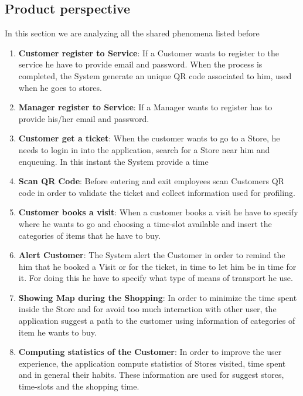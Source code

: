 \documentclass[a4paper, 10pt, oneside]{article}
\newcommand{\yasmin}[1]{\textcolor{Red}{#1}}
\newcommand{\giovanni}[1]{\textcolor{Blue}{#1}}
\begin{document}
\subsection{Product perspective}
In this section we are analyzing all the shared phenomena listed before
\begin{enumerate}
\item \textbf{Customer register to Service}: If a Customer wants to register to the service he have to provide email and password.
When the process is completed, the System generate an unique QR code associated to him, used when he goes to stores.

\item \textbf{Manager register to Service}: If a Manager wants to register has to provide his/her email and password. 

\item \textbf{Customer get a ticket}: When the customer wants to go to a Store, he needs to login in into the application, search for a Store near him and enqueuing. In this instant the System provide a time 

\item \textbf{Scan QR Code}: Before entering and exit employees scan Customers QR code in order to validate the ticket and collect information used for profiling.

\item \textbf{Customer books a visit}: When a customer books a visit he have to specify where he wants to go and choosing a time-slot available and insert the categories of items that he have to buy. 

\item \textbf{Alert Customer}: The System alert the Customer in order to remind the him that he booked a Visit or for the ticket, in time to let him be in time for it.
For doing this he have to specify what type of means of transport he use.

\item \textbf{Showing Map during the Shopping}: In order to minimize the time spent inside the Store
and for avoid too much interaction with other user, the application suggest a path to the customer using information of categories of item he wants to buy.

\item \textbf{Computing statistics of the Customer}: In order to improve the user experience, the application compute statistics of Stores visited, time spent and in general their habits. These information are used for suggest stores, time-slots and the shopping time. %
\end{enumerate}
\end{document}
